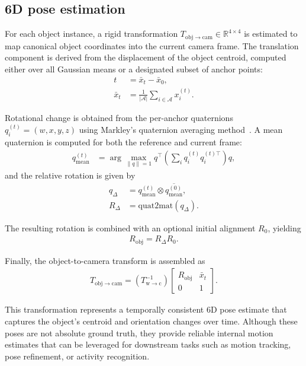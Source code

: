 \subsection{6D pose estimation}
For each object instance, a rigid transformation 
$T_{\mathrm{obj}\rightarrow\mathrm{cam}} \in \mathbb{R}^{4\times4}$ 
is estimated to map canonical object coordinates into the current camera frame. 
The translation component is derived from the displacement of the object centroid, 
computed either over all Gaussian means or a designated subset of anchor points:
\begin{align}
t &= \bar{x}_{t} - \bar{x}_{0}, \\
\bar{x}_{t} &= \frac{1}{|\mathcal{A}|} \sum_{i \in \mathcal{A}} x_i^{(t)}.
\end{align}

Rotational change is obtained from the per-anchor quaternions 
$q_i^{(t)} = (w,x,y,z)$ using Markley’s quaternion averaging method~\cite{markley2007averaging}. 
A mean quaternion is computed for both the reference and current frame:
\begin{align}
q^{(t)}_{\mathrm{mean}} &= 
\arg\max_{\|q\|=1} q^\top
\left(\sum_i q_i^{(t)} q_i^{(t)\top}\right) q,
\end{align}
and the relative rotation is given by
\begin{align}
q_{\Delta} &= q^{(t)}_{\mathrm{mean}} \otimes \overline{q^{(0)}_{\mathrm{mean}}}, \\
R_{\Delta} &= \mathrm{quat2mat}(q_{\Delta}).
\end{align}

The resulting rotation is combined with an optional initial alignment $R_0$, yielding
\begin{align}
R_{\mathrm{obj}} = R_{\Delta} R_0.
\end{align}

Finally, the object-to-camera transform is assembled as
\begin{align}
T_{\mathrm{obj}\rightarrow\mathrm{cam}} =
\left(T_{\mathrm{w}\rightarrow\mathrm{c}}^{-1}\right)
\begin{bmatrix}
R_{\mathrm{obj}} & \bar{x}_{t} \\
0 & 1
\end{bmatrix}.
\end{align}

This transformation represents a temporally consistent 6D pose estimate 
that captures the object’s centroid and orientation changes over time. 
Although these poses are not absolute ground truth, 
they provide reliable internal motion estimates that can be leveraged 
for downstream tasks such as motion tracking, pose refinement, or activity recognition.




